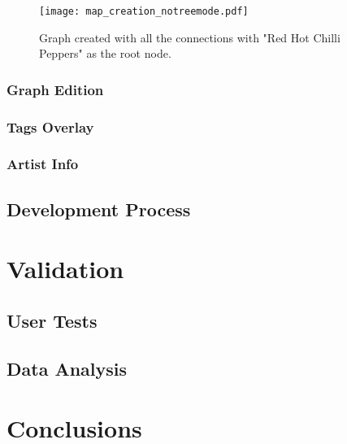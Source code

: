       \begin{figure}[tb]
        \begin{center}
          \texttt{[image: map\_creation\_notreemode.pdf]}
        \end{center}
        \caption{Graph created with all the connections with "Red Hot Chilli Peppers" as the root node.}
        \label{fig:graph_notreemode}
      \end{figure}




    \subsubsection{Graph Edition} %
      \label{ssub:edition}
    


    \subsubsection{Tags Overlay} %
      \label{ssub:tags_overlay}
    



    \subsubsection{Artist Info} %
      \label{ssub:artist_info}
    





  \subsection{Development Process} %
    \label{sub:development_process}



\section{Validation} %
\label{sec:validation}


  \subsection{User Tests} %
  \label{sub:user_tests}
  

  \subsection{Data Analysis} %
  \label{sub:data_analysis}
  


\section{Conclusions} %
  \label{sec:conclusions}



